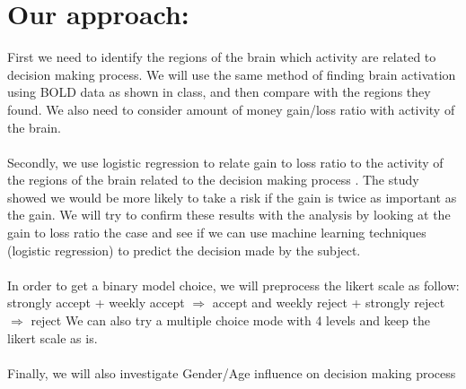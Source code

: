 \documentclass{article}
\begin{document}
\section{Our approach:}
\noindent
First we need to identify the regions of the brain which activity are related to decision making process. We will use the same method of finding brain activation using BOLD data as shown in class, and then compare with the regions they found. We also need to consider amount of money gain/loss ratio with activity of the brain.\\\\
Secondly, we use logistic regression to relate gain to loss ratio to the activity of the regions of the brain related to the decision making process . The study showed we would be more likely to take a risk if the gain is twice as important as the gain. We will try to confirm these results with the analysis by looking at the gain to loss ratio the case and see if we can use machine learning techniques (logistic regression) to predict the decision made by the subject.\\\\
In order to get a binary model choice, we will preprocess the likert scale as follow: strongly accept + weekly accept $\Rightarrow$ accept and weekly reject + strongly reject $\Rightarrow$ reject
We can also try a multiple choice mode with 4 levels and keep the likert scale as is.\\\\
Finally, we will also investigate Gender/Age influence on decision making process
\end{document}

